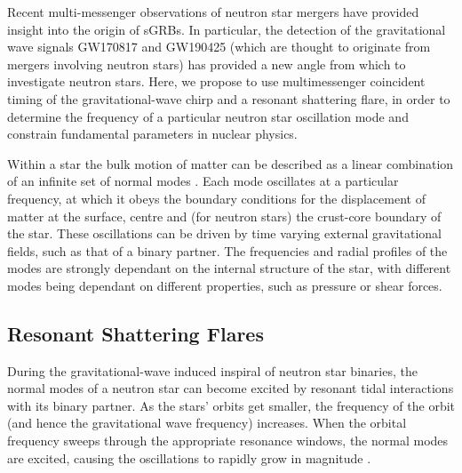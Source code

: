 \documentclass[fleqn,usenatbib]{mnras}
\begin{document}
Recent multi-messenger observations of neutron star mergers have provided insight into the origin of sGRBs. In particular, the detection of the gravitational wave signals GW170817 \citet{abbott2017merger} and GW190425 \citet{abbott2020gw190425} (which are thought to originate from mergers involving neutron stars) has provided a new angle from which to investigate neutron stars. Here, we propose to use multimessenger coincident timing of the gravitational-wave chirp and a resonant shattering flare, in order to determine the frequency of a particular neutron star oscillation mode and constrain fundamental parameters in nuclear physics.

Within a star the bulk motion of matter can be described as a linear combination of an infinite set of normal modes \citet{smeyers2011linear}. Each mode oscillates at a particular frequency, at which it obeys the boundary conditions for the displacement of matter at the surface, centre and (for neutron stars) the crust-core boundary of the star. These oscillations can be driven by time varying external gravitational fields, such as that of a binary partner. The frequencies and radial profiles of the modes are strongly dependant on the internal structure of the star, with different modes being dependant on different properties, such as pressure or shear forces.






\subsection{Resonant Shattering Flares}
\hspace{\parindent}During the gravitational-wave induced inspiral of neutron star binaries, the normal modes of a neutron star can become excited by resonant tidal interactions with its binary partner. As the stars' orbits get smaller, the frequency of the orbit (and hence the gravitational wave frequency) increases. When the orbital frequency sweeps through the appropriate resonance windows, the normal modes are excited, causing the oscillations to rapidly grow in magnitude \citep{tsang2012resonant, tsang2013shattering, lai1994resonant}.
\end{document}
